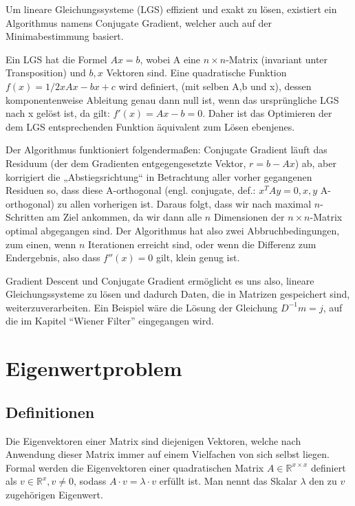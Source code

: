 \documentclass[]{dsadokumentation}
\begin{document}
Um lineare Gleichungssysteme (LGS) effizient und exakt zu lösen, existiert ein Algorithmus namens Conjugate Gradient, welcher auch auf der Minimabestimmung basiert.

Ein LGS hat die Formel $Ax = b$, wobei A eine $ n \times n $-Matrix (invariant unter Transposition) und $ b,x $ Vektoren sind. Eine quadratische Funktion $ f(x) = 1/2xAx-bx+c $ wird definiert, (mit selben A,b und x), dessen komponentenweise Ableitung genau dann null ist, wenn das ursprüngliche LGS nach x gelöst ist, da gilt: $f'(x) = Ax-b = 0$. Daher ist das Optimieren der dem LGS entsprechenden Funktion äquivalent zum Lösen ebenjenes.

Der Algorithmus funktioniert folgendermaßen: Conjugate Gradient läuft das Residuum (der dem Gradienten entgegengesetzte Vektor, $ r = b-Ax $) ab, aber korrigiert die „Abstiegsrichtung“ in Betrachtung aller vorher gegangenen Residuen so, dass diese A-orthogonal (engl. conjugate, def.: $x^TAy = 0, x,y$ A-orthogonal) zu allen vorherigen ist. Daraus folgt, dass wir nach maximal $n$-Schritten am Ziel ankommen, da wir dann alle $n$ Dimensionen der $ n \times n $-Matrix optimal abgegangen sind. Der Algorithmus hat also zwei Abbruchbedingungen, zum einen, wenn $n$ Iterationen erreicht sind, oder wenn die Differenz zum Endergebnis, also dass $ f''(x) = 0 $ gilt, klein genug ist.

Gradient Descent und Conjugate Gradient ermöglicht es uns also, lineare Gleichungssysteme zu lösen und dadurch Daten, die in Matrizen gespeichert sind, weiterzuverarbeiten. Ein Beispiel wäre die Lösung der Gleichung $ D^{-1} m = j $, auf die im Kapitel \enquote{Wiener Filter} eingegangen wird.

\section{Eigenwertproblem}

\subsection{Definitionen}\label{k4.2.eigen.def}

Die Eigenvektoren einer Matrix sind diejenigen Vektoren, welche nach Anwendung dieser Matrix immer auf einem Vielfachen von sich selbst liegen.
Formal werden die Eigenvektoren einer quadratischen Matrix $A \in \mathbb{R}^{x \times x}$ definiert als $v \in \mathbb{R}^{x}, v \neq 0$, sodass $A \cdot v = \lambda \cdot v$ erfüllt ist. Man nennt das Skalar $\lambda$ den zu $v$ zugehörigen Eigenwert.
\end{document}
